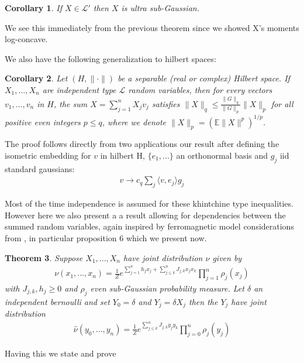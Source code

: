 \documentclass[10pt]{article}
\newcommand{\E}{\mathbb{E}}
\newcommand{\1}{\textbf{1}}
\newtheorem{theorem}{Theorem}
\newtheorem{corollary}[theorem]{Corollary}
\theoremstyle{remark}
\theoremstyle{definition}
\begin{document}
\begin{corollary}
	If $X \in \mathcal{L}'$ then $X$ is ultra sub-Gaussian. 
\end{corollary}

We see this immediately from the previous theorem since we showed X's moments log-concave. 

We also have the following generalization to hilbert spaces: 

\begin{corollary}
Let $(H,\|\cdot\|)$ be a separable (real or complex) Hilbert space. If $X_1, \ldots, X_n$ are independent type $\mathcal{L}$ random variables, then for every vectors $v_1, \ldots, v_n$ in $H$, the sum $X = \sum_{j=1}^n X_jv_j$ satisfies $\|X\|_q \leq \frac{\|G\|_q}{\|G\|_p}\|X\|_p$ for all positive even integers $p \leq q$, where we denote $\|X\|_p = (\E\|X\|^p)^{1/p}$.
\end{corollary}

The proof follows directly from two applications our result after defining the isometric embedding for $v$ in hilbert H, $\{e_1,...\}$ an orthonormal basis and $g_j$ iid standard gaussians:
\begin{align*}
	v \to c_q \sum_j \langle v,e_j\rangle g_j
\end{align*}

Most of the time independence is assumed for these khintchine type inequalities. However here we also present a a result allowing for dependencies between the summed random variables, again inspired by ferromagnetic model considerations from \cite{GN}, in particular proposition 6 which we present now.

\begin{theorem}
	Suppose $X_1,...,X_n$ have joint distribution $\nu$ given by 
	\begin{align*}
		\nu(x_1,...,x_n) = \frac{1}{Z}e^{\sum_{j=1}^n h_j x_j + \sum_{j \leq k}^n J_{j,k}x_jx_k}\prod_{j=1}^n \rho_j(x_j)
	\end{align*}
	with $J_{j,k},h_j \geq 0$ and $\rho_j$ even sub-Gaussian probability measure. Let $\delta$ an independent bernoulli and set $Y_0 = \delta$ and $Y_j = \delta X_j$ then the $Y_j$ have joint distribution 
	\begin{align*}
		\hat{\nu}(y_0,...,y_n) = \frac{1}{Z}e^{\sum_{j \leq k}^n J_{j,k}y_jy_k}\prod_{j=0}^n \rho_j(y_j)
	\end{align*}
\end{theorem}

Having this we state and prove %
\end{document}
